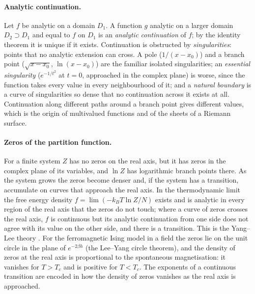\documentclass[10pt,a4paper]{article}
\theoremstyle{remark}
\begin{document}
\paragraph{Analytic continuation.} Let $f$ be analytic on a domain $D_1$. A
function $g$ analytic on a larger domain $D_2\supset D_1$ and equal to $f$ on
$D_1$ is an \emph{analytic continuation} of $f$; by the identity theorem it
is unique if it exists. Continuation is obstructed by \emph{singularities}:
points that no analytic extension can cross. A pole ($1/(x-x_0)$) and a branch
point ($\sqrt{x-x_0}$, $\ln(x-x_0)$) are the familiar isolated singularities;
an \emph{essential singularity} ($e^{-1/t^{2}}$ at $t=0$, approached in the
complex plane) is worse, since the function takes every value in every
neighbourhood of it; and a \emph{natural boundary} is a curve of singularities
so dense that no continuation across it exists at all. Continuation along
different paths around a branch point gives different values, which is the
origin of multivalued functions and of the sheets of a Riemann surface.

\paragraph{Zeros of the partition function.} For a finite system $Z$ has no
zeros on the real axis, but it has zeros in the complex plane of its
variables, and $\ln Z$ has logarithmic branch points there. As the system
grows the zeros become denser and, if the system has a transition, accumulate
on curves that approach the real axis. In the thermodynamic limit the free
energy density $f=\lim(-k_BT\ln Z/N)$ exists and is analytic in every region
of the real axis that the zeros do not touch; where a curve of zeros crosses
the real axis, $f$ is continuous but its analytic continuation from one side
does not agree with its value on the other side, and there is a transition.
This is the Yang--Lee theory \cite{YangLee}. For the ferromagnetic Ising model
in a field the zeros lie on the unit circle in the plane of $e^{-2\beta h}$
(the Lee--Yang circle theorem), and the density of zeros at the real axis is
proportional to the spontaneous magnetisation: it vanishes for $T>T_c$ and is
positive for $T<T_c$. The exponents of a continuous transition are encoded in
how the density of zeros vanishes as the real axis is approached.
\end{document}
